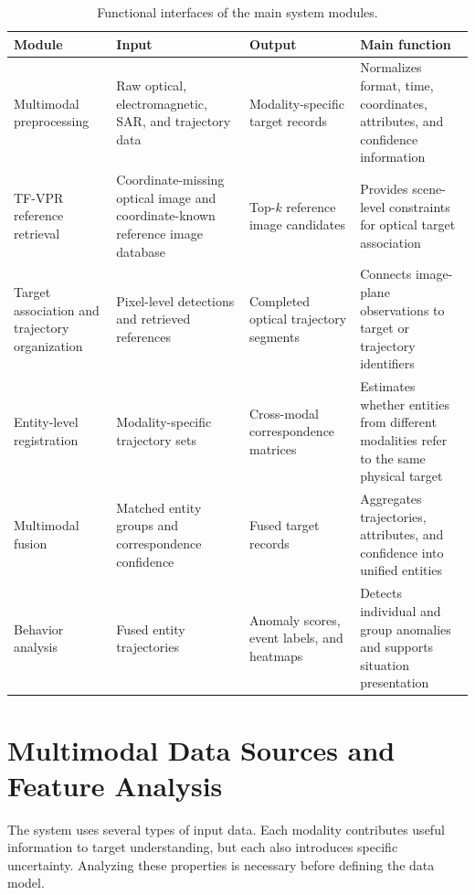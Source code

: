\begin{table}[htb]
  \centering
  \caption{Functional interfaces of the main system modules.}
  \label{tab:chapter2-module-interface}
  \setlength{\tabcolsep}{4pt}
  \renewcommand{\arraystretch}{0.95}
  \small
  \begin{tabular}{>{\raggedright\arraybackslash}p{}>{\raggedright\arraybackslash}p{}>{\raggedright\arraybackslash}p{}>{\raggedright\arraybackslash}p{}}
    \toprule
    Module & Input & Output & Main function \\
    \midrule
    Multimodal preprocessing & Raw optical, electromagnetic, SAR, and trajectory data & Modality-specific target records & Normalizes format, time, coordinates, attributes, and confidence information \\
    TF-VPR reference retrieval & Coordinate-missing optical image and coordinate-known reference image database & Top-\(k\) reference image candidates & Provides scene-level constraints for optical target association \\
    Target association and trajectory organization & Pixel-level detections and retrieved references & Completed optical trajectory segments & Connects image-plane observations to target or trajectory identifiers \\
    Entity-level registration & Modality-specific trajectory sets & Cross-modal correspondence matrices & Estimates whether entities from different modalities refer to the same physical target \\
    Multimodal fusion & Matched entity groups and correspondence confidence & Fused target records & Aggregates trajectories, attributes, and confidence into unified entities \\
    Behavior analysis & Fused entity trajectories & Anomaly scores, event labels, and heatmaps & Detects individual and group anomalies and supports situation presentation \\
    \bottomrule
  \end{tabular}
\end{table}

\section{Multimodal Data Sources and Feature Analysis}
The system uses several types of input data. Each modality contributes useful information to target understanding, but each also introduces specific uncertainty. Analyzing these properties is necessary before defining the data model.

